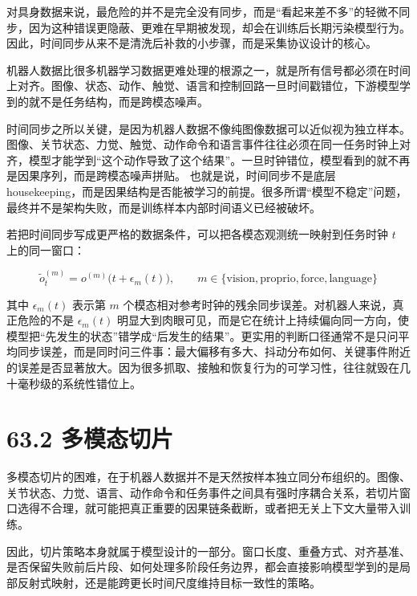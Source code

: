 对具身数据来说，最危险的并不是完全没有同步，而是“看起来差不多”的轻微不同步，因为这种错误更隐蔽、更难在早期被发现，却会在训练后长期污染模型行为。因此，时间同步从来不是清洗后补救的小步骤，而是采集协议设计的核心。

机器人数据比很多机器学习数据更难处理的根源之一，就是所有信号都必须在时间上对齐。图像、状态、动作、触觉、语言和控制回路一旦时间戳错位，下游模型学到的就不是任务结构，而是跨模态噪声。

时间同步之所以关键，是因为机器人数据不像纯图像数据可以近似视为独立样本。图像、关节状态、力觉、触觉、动作命令和语言事件往往必须在同一任务时钟上对齐，模型才能学到“这个动作导致了这个结果”。一旦时钟错位，模型看到的就不再是因果序列，而是跨模态噪声拼贴。 也就是说，时间同步不是底层 housekeeping，而是因果结构是否能被学习的前提。很多所谓“模型不稳定”问题，最终并不是架构失败，而是训练样本内部时间语义已经被破坏。

若把时间同步写成更严格的数据条件，可以把各模态观测统一映射到任务时钟 \(t\) 上的同一窗口：

\begingroup
\scriptsize
\begin{equation*}
\tilde{o}^{(m)}_t = o^{(m)}\bigl(t + \epsilon_m(t)\bigr), \qquad m \in \{\text{vision},\text{proprio},\text{force},\text{language}\}
\end{equation*}
\endgroup

其中 \(\epsilon_m(t)\) 表示第 \(m\) 个模态相对参考时钟的残余同步误差。对机器人来说，真正危险的不是 \(\epsilon_m(t)\) 明显大到肉眼可见，而是它在统计上持续偏向同一方向，使模型把“先发生的状态”错学成“后发生的结果”。更实用的判断口径通常不是只问平均同步误差，而是同时问三件事：最大偏移有多大、抖动分布如何、关键事件附近的误差是否显著放大。因为很多抓取、接触和恢复行为的可学习性，往往就毁在几十毫秒级的系统性错位上。

\section*{63.2 多模态切片}


多模态切片的困难，在于机器人数据并不是天然按样本独立同分布组织的。图像、关节状态、力觉、语言、动作命令和任务事件之间具有强时序耦合关系，若切片窗口选得不合理，就可能把真正重要的因果链条截断，或者把无关上下文大量带入训练。

因此，切片策略本身就属于模型设计的一部分。窗口长度、重叠方式、对齐基准、是否保留失败前后片段、如何处理多阶段任务边界，都会直接影响模型学到的是局部反射式映射，还是能跨更长时间尺度维持目标一致性的策略。

